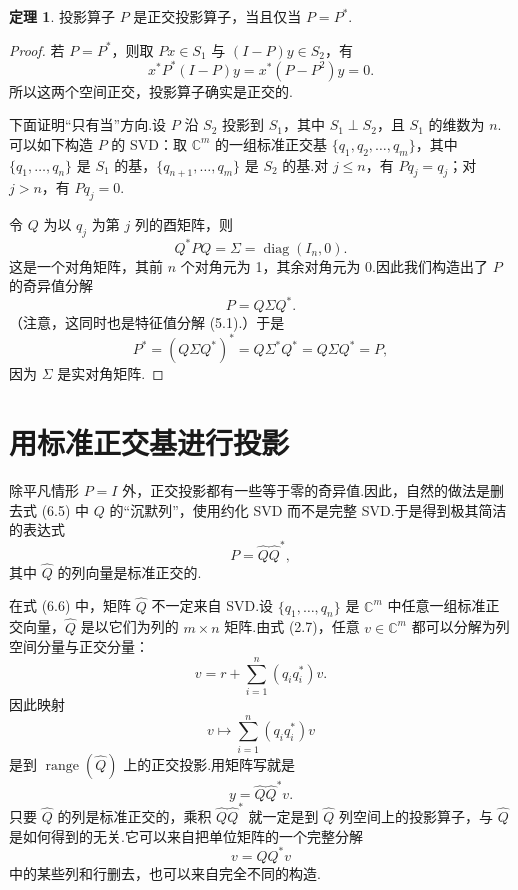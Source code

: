 \documentclass[UTF8,fontset=none,12pt]{ctexart}
\newcommand{\C}{\mathbb{C}}
\newcommand{\range}{\operatorname{range}}
\theoremstyle{definition}
\newtheorem{theorem}{定理}
\begin{document}
\begin{theorem}
投影算子 $P$ 是正交投影算子，当且仅当 $P=P^*$.
\end{theorem}

\begin{proof}
若 $P=P^*$，则取 $Px\in S_1$ 与 $(I-P)y\in S_2$，有
\[
    x^*P^*(I-P)y=x^*(P-P^2)y=0.
\]
所以这两个空间正交，投影算子确实是正交的.

下面证明“只有当”方向.设 $P$ 沿 $S_2$ 投影到 $S_1$，其中 $S_1\perp S_2$，且 $S_1$ 的维数为 $n$.可以如下构造 $P$ 的 SVD：取 $\C^m$ 的一组标准正交基 $\{q_1,q_2,\ldots,q_m\}$，其中 $\{q_1,\ldots,q_n\}$ 是 $S_1$ 的基，$\{q_{n+1},\ldots,q_m\}$ 是 $S_2$ 的基.对 $j\le n$，有 $Pq_j=q_j$；对 $j>n$，有 $Pq_j=0$.

令 $Q$ 为以 $q_j$ 为第 $j$ 列的酉矩阵，则
\[
    Q^*PQ=\Sigma=\operatorname{diag}(I_n,0).
\]
这是一个对角矩阵，其前 $n$ 个对角元为 1，其余对角元为 0.因此我们构造出了 $P$ 的奇异值分解
\begin{equation}
    P=Q\Sigma Q^*.
    \tag{6.5}
\end{equation}
（注意，这同时也是特征值分解 (5.1).）于是
\[
    P^*=(Q\Sigma Q^*)^*=Q\Sigma^*Q^*=Q\Sigma Q^*=P,
\]
因为 $\Sigma$ 是实对角矩阵.
\end{proof}

\section*{用标准正交基进行投影}

除平凡情形 $P=I$ 外，正交投影都有一些等于零的奇异值.因此，自然的做法是删去式 (6.5) 中 $Q$ 的“沉默列”，使用约化 SVD 而不是完整 SVD.于是得到极其简洁的表达式
\begin{equation}
    P=\widehat Q\widehat Q^*,
    \tag{6.6}
\end{equation}
其中 $\widehat Q$ 的列向量是标准正交的.

在式 (6.6) 中，矩阵 $\widehat Q$ 不一定来自 SVD.设 $\{q_1,\ldots,q_n\}$ 是 $\C^m$ 中任意一组标准正交向量，$\widehat Q$ 是以它们为列的 $m\times n$ 矩阵.由式 (2.7)，任意 $v\in\C^m$ 都可以分解为列空间分量与正交分量：
\[
    v=r+\sum_{i=1}^n(q_iq_i^*)v.
\]
因此映射
\begin{equation}
    v\longmapsto\sum_{i=1}^n(q_iq_i^*)v
    \tag{6.7}
\end{equation}
是到 $\range(\widehat Q)$ 上的正交投影.用矩阵写就是
\[
    y=\widehat Q\widehat Q^*v.
\]
只要 $\widehat Q$ 的列是标准正交的，乘积 $\widehat Q\widehat Q^*$ 就一定是到 $\widehat Q$ 列空间上的投影算子，与 $\widehat Q$ 是如何得到的无关.它可以来自把单位矩阵的一个完整分解
\[
    v=QQ^*v
\]
中的某些列和行删去，也可以来自完全不同的构造.
\end{document}
